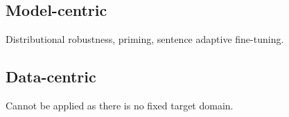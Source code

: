 \subsection{Model-centric}
Distributional robustness, priming, sentence adaptive fine-tuning.
\cite{Oren19distributionally}
\cite{Li18onesentence}
\cite{Farajian17multidomain}
\subsection{Data-centric}
Cannot be applied as there is no fixed target domain. 
































































































